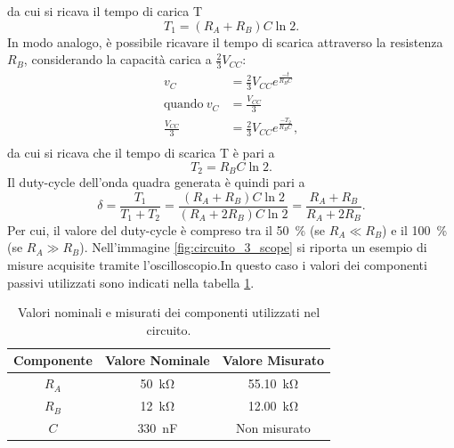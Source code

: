 da cui si ricava il tempo di carica T
\begin{equation}
	T_{1}=(R_A+R_B)C\ln{2}.
\end{equation}
In modo analogo, è possibile ricavare il tempo di scarica attraverso la resistenza $R_B$, considerando la capacità carica a $\frac{2}{3}V_{CC}$:
\begin{equation}
	\begin{split}
		v_C&=\frac{2}{3}V_{CC}e^{\frac{-t}{R_BC}} \\
		\text{quando} \ v_C&=\frac{V_{CC}}{3} \\
		\frac{V_{CC}}{3}&=\frac{2}{3}V_{CC}e^{\frac{-T_2}{R_BC}}, \\
	\end{split}
\end{equation}
da cui si ricava che il tempo di scarica T è pari a
\begin{equation}
	T_2=R_B C \ln{2}.
\end{equation}
Il duty-cycle dell'onda quadra generata è quindi pari a 
\begin{equation}
	\delta=\frac{T_1}{T_1+T_2}=\frac{(R_A+R_B)C\ln{2}}{(R_A+2R_B)C\ln{2}}=\frac{R_A+R_B}{R_A+2R_B}.
	\label{eq:3_1}
\end{equation}
Per cui, il valore del duty-cycle è compreso tra il \SI{50}{\percent} (se $R_A\ll R_B$) e il \SI{100}{\percent} (se $R_A \gg R_B$). 
\noindent
Nell'immagine \ref{fig:circuito_3_scope} si riporta un esempio di misure acquisite tramite l'oscilloscopio.In questo caso i valori dei componenti passivi utilizzati sono indicati nella tabella \ref{tab:valori_componenti_3}.
\def\arraystretch{1.3}
\begin{table}[h!]
	\centering
	\begin{tabular}{|c|c|c|}
		\hline
		Componente	& Valore Nominale & Valore Misurato \\ \hline
		$R_A$ &\SI{50}{\kilo\ohm} & \SI{55.10}{\kilo\ohm} \\ \hline
		$R_B$ &\SI{12}{\kilo\ohm} & \SI{12.00}{\kilo\ohm} \\ \hline
		$C$ & \SI{330}{\nano\farad} & Non misurato \\ \hline
	\end{tabular}
	\caption{Valori nominali e misurati dei componenti utilizzati nel circuito.}
	\label{tab:valori_componenti_3}
\end{table}
